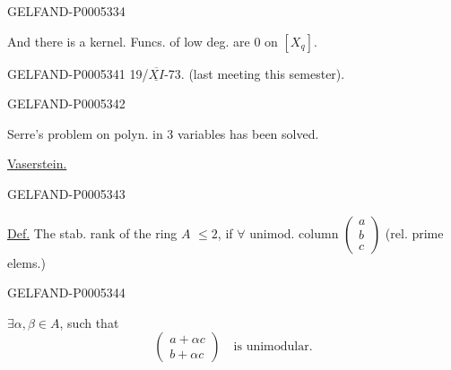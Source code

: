 \begin{GelfandAdjacentEvidence}{GELFAND-P000533}{4}


And there is a kernel. Funcs. of low deg. are $0$ on $[X_q]$.
\end{GelfandAdjacentEvidence}



\begin{GelfandAdjacentEvidence}{GELFAND-P000534}{1}
19/\mbox{$\overline{\underline{XI}}$}-73.\qquad{} (last meeting this semester).
\end{GelfandAdjacentEvidence}
\begin{GelfandAdjacentEvidence}{GELFAND-P000534}{2}


Serre’s problem on polyn. in 3 variables has been solved.

\uline{Vaserstein.}
\end{GelfandAdjacentEvidence}
\begin{GelfandAdjacentEvidence}{GELFAND-P000534}{3}


\uline{Def.} The stab. rank of the ring $A$ $\le2$, if $\forall$ unimod. column
$\begin{pmatrix}a\\b\\c\end{pmatrix}$ (rel. prime elems.)
\end{GelfandAdjacentEvidence}
\begin{GelfandAdjacentEvidence}{GELFAND-P000534}{4}

$\exists\alpha,\beta\in A$, such that
\[
\begin{pmatrix}a+\alpha c\\b+\alpha c\end{pmatrix}
\quad\text{is unimodular}.
\]
\end{GelfandAdjacentEvidence}
